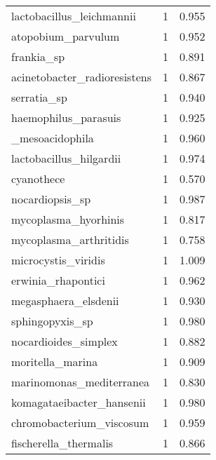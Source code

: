 \begin{tabular}{lrr}
                   lactobacillus\_leichmannii &                   1 &     0.955 \\
                          atopobium\_parvulum &                   1 &     0.952 \\
                                  frankia\_sp &                   1 &     0.891 \\
                acinetobacter\_radioresistens &                   1 &     0.867 \\
                                 serratia\_sp &                   1 &     0.940 \\
                        haemophilus\_parasuis &                   1 &     0.925 \\
                [pseudomonas]\_mesoacidophila &                   1 &     0.960 \\
                     lactobacillus\_hilgardii &                   1 &     0.974 \\
                                  cyanothece &                   1 &     0.570 \\
                             nocardiopsis\_sp &                   1 &     0.987 \\
                        mycoplasma\_hyorhinis &                   1 &     0.817 \\
                      mycoplasma\_arthritidis &                   1 &     0.758 \\
                         microcystis\_viridis &                   1 &     1.009 \\
                          erwinia\_rhapontici &                   1 &     0.962 \\
                        megasphaera\_elsdenii &                   1 &     0.930 \\
                             sphingopyxis\_sp &                   1 &     0.980 \\
                        nocardioides\_simplex &                   1 &     0.882 \\
                            moritella\_marina &                   1 &     0.909 \\
                    marinomonas\_mediterranea &                   1 &     0.830 \\
                   komagataeibacter\_hansenii &                   1 &     0.980 \\
                    chromobacterium\_viscosum &                   1 &     0.959 \\
                       fischerella\_thermalis &                   1 &     0.866 \\

\end{tabular}
